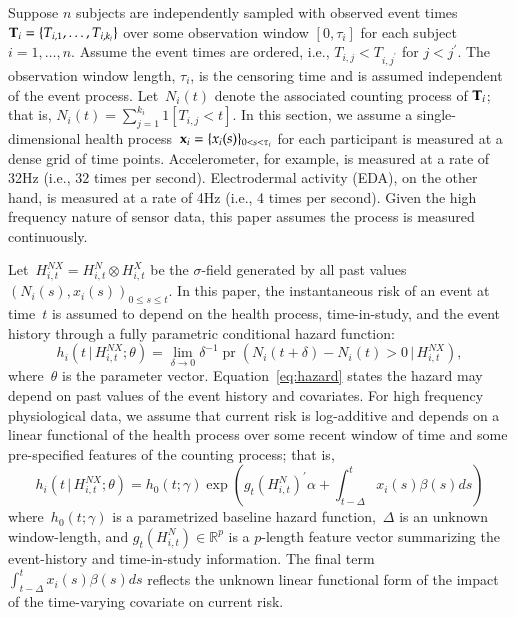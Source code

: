 \documentclass[11pt]{amsart}
\def\pr{\mathop{\text{pr}}\nolimits}
\def\pr{\mathop{\text{pr}}\nolimits}
\def\given{\, | \,}
\def\Given{\, \big | \,}
\def\bfx{{\bf x}}
\def\bfT{{\bf T}}
\begin{document}
Suppose $n$ subjects are independently sampled with observed event times~$\bfT_{i} = \{ T_{i,1}, \ldots, T_{i,k_i}\}$ over some observation window $[0, \tau_i]$ for each subject $i = 1,\ldots, n$.  Assume the event times are ordered, i.e., $T_{i,j} < T_{i,j^\prime}$ for $j < j^\prime$. The observation window length, $\tau_i$, is the censoring time and is assumed independent of the event process. Let~$N_{i} (t)$ denote the associated counting process of $\bfT_{i}$; that is, $N_i (t) = \sum_{j=1}^{k_i} 1 [ T_{i,j} < t ]$. In this section, we assume a single-dimensional health process~$\bfx_i = \{ x_i (s) \}_{0 < s < \tau_i}$ for each participant is measured at a dense grid of time points.  Accelerometer, for example, is measured at a rate of 32Hz (i.e., $32$ times per second). Electrodermal activity (EDA), on the other hand, is measured at a rate of 4Hz (i.e., 4 times per second).  Given the high frequency nature of sensor data, this paper assumes the process is measured continuously.

Let~$H_{i,t}^{NX} = H_{i,t}^{N} \otimes H_{i,t}^{X}$ be the $\sigma$-field generated by all past values~$(N_i (s), x_i (s))_{0 \leq s \leq t}$. In this paper, the instantaneous risk of an event at time~$t$ is assumed to depend on the health process, time-in-study, and the event history through a fully parametric conditional hazard function:
\begin{equation}
\label{eq:hazard}
h_i \left( t \Given H_{i,t}^{NX} ; \theta \right) =
\lim_{\delta \to 0} \delta^{-1} \pr \left( N_i(t+\delta) - N_i(t) > 0
  \given H_{i,t}^{NX} \right),
\end{equation}
where~$\theta$ is the parameter vector. Equation~\eqref{eq:hazard} states the hazard may depend on past values of the event history and covariates.  For high frequency physiological data, we assume that current risk is log-additive and depends on a linear functional of the health process over some recent window of time and some pre-specified features of the counting process; that is,
\begin{equation}
\label{eq:hazardlinear}
h_i \left( t \given  H_{i,t}^{NX} ; \theta \right) =
h_0 (t; \gamma) \exp \left( g_t \left( H_{i,t}^{N} \right)^{\prime} \alpha
  + \int_{t-\Delta}^t x_i (s) \beta(s) ds  \right)
\end{equation}
where~$h_0(t;\gamma)$ is a parametrized baseline hazard function,~$\Delta$ is an unknown window-length, and $g_t( H_{i,t}^N ) \in \mathbb{R}^p$ is a $p$-length feature vector summarizing the event-history and time-in-study information. The final term~$\int_{t-\Delta}^t x_i(s) \beta(s) ds$ reflects the unknown linear functional form of the impact of the time-varying covariate on current risk.
\end{document}
